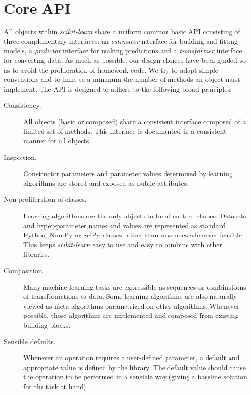 \documentclass{llncs}
\newcommand{\sklearn}{\textit{scikit-learn}\xspace}
\begin{document}
\section{Core API}

\label{sec:core-api}

All objects within \sklearn share a uniform common basic API consisting of three
complementary interfaces: an \textit{estimator} interface for building and
fitting models, a \textit{predictor} interface for making predictions and a
\textit{transformer} interface for converting data. As much as possible, our
design choices have been guided so as to avoid the proliferation of framework
code. We try to adopt simple conventions and to limit to a minimum the number of
methods an object must implement. The API is designed to adhere to the following
broad principles:

\begin{description}
  \item[Consistency.]
       All objects (basic or composed) share a consistent interface composed of
       a limited set of methods. This interface is documented in a consistent
       manner for all objects.
  \item[Inspection.]
       Constructor parameters and parameter values determined by learning
       algorithms are stored and exposed as public attributes.
  \item[Non-proliferation of classes.]
       Learning algorithms are the only objects to be of custom classes.
       Datasets and hyper-parameter names and values are represented as standard
       Python, NumPy or SciPy classes rather than new ones whenever feasible.
       This keeps \sklearn easy to use and easy to combine with other libraries.
  \item[Composition.]
       Many machine learning tasks are expressible
       as sequences or combinations of transformations to data.
       Some learning algorithms are also naturally viewed
       as meta-algorithms parametrized on other algorithms.
       Whenever possible, those algorithms are implemented and composed from
       existing building blocks.
  \item[Sensible defaults.]
       Whenever an operation requires a user-defined parameter,
       a default and appropriate value is defined by the library.
       The default value should cause the operation to be performed
       in a sensible way (giving a baseline solution for the task at hand).
\end{description}
\end{document}
